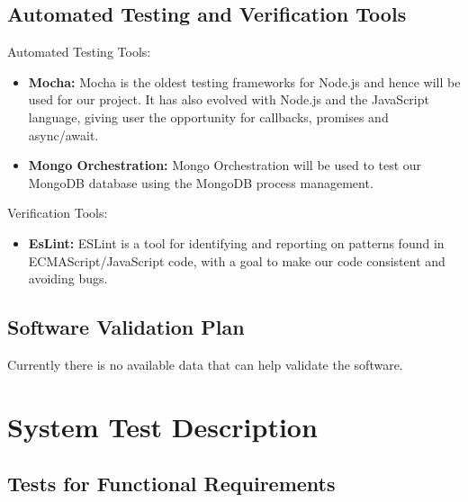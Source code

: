 \documentclass[12pt, titlepage]{article}
\begin{document}
\subsection{Automated Testing and Verification Tools}
Automated Testing Tools:
\begin{itemize}
    \item \textbf{Mocha:} Mocha is the oldest testing frameworks for Node.js and hence will be used for our project. It has also evolved with Node.js and the JavaScript language, giving user the opportunity for callbacks, promises and async/await. 
    \item \textbf{Mongo Orchestration:} Mongo Orchestration will be used to test our MongoDB database using the MongoDB process management.
\end{itemize}
Verification Tools:
\begin{itemize}
    \item \textbf{EsLint:} ESLint is a tool for identifying and reporting on patterns found in ECMAScript/JavaScript code, with a goal to make our code consistent and avoiding bugs.
\end{itemize}

\subsection{Software Validation Plan}

Currently there is no available data that can help validate the software.




\section{System Test Description}
	
\subsection{Tests for Functional Requirements}
\end{document}
